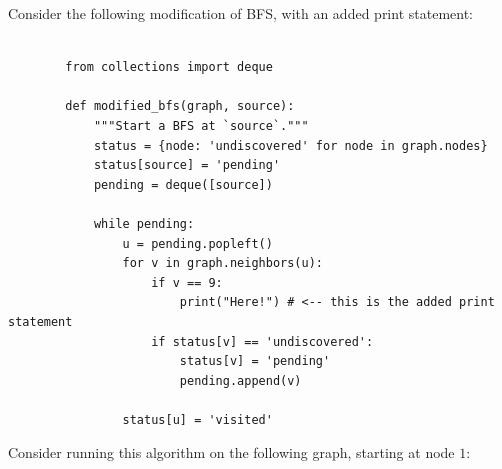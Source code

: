 \Needspace{9in}
\begin{prob}

    Consider the following modification of BFS, with an added print statement:

    \begin{verbatim}

        from collections import deque

        def modified_bfs(graph, source):
            """Start a BFS at `source`."""
            status = {node: 'undiscovered' for node in graph.nodes}
            status[source] = 'pending'
            pending = deque([source])

            while pending:
                u = pending.popleft()
                for v in graph.neighbors(u):
                    if v == 9:
                        print("Here!") # <-- this is the added print statement
                    if status[v] == 'undiscovered':
                        status[v] = 'pending'
                        pending.append(v)

                status[u] = 'visited'

    \end{verbatim}

    Consider running this algorithm on the following graph, starting at node $1$:

    \begin{center} 
\end{center}
\end{prob}
